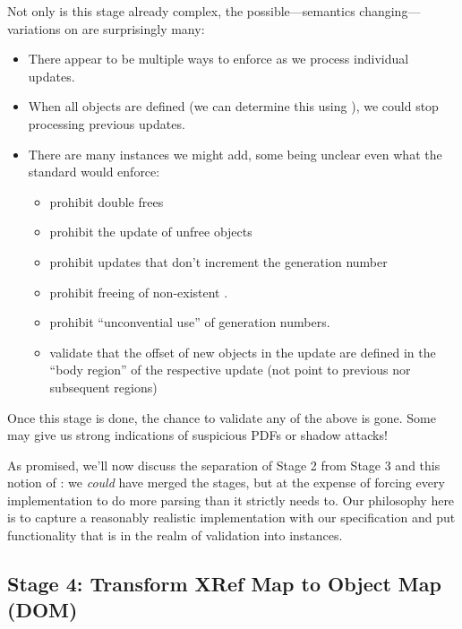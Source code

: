 Not only is this stage already complex, the
possible---semantics changing---variations on
 are surprisingly many:
\begin{itemize}
\item There appear to be multiple ways to enforce  as we
  process individual updates.
\item When all objects are defined (we can determine this using
  ), we could stop processing previous updates.
\item There are many  instances we might add,
  some being unclear even what the standard would enforce:
  \begin{itemize}
  \item prohibit double frees
  \item prohibit the update of unfree objects
  \item prohibit updates that don't increment the generation number
  \item prohibit freeing of non-existent \objids{}.
  \item prohibit ``unconvential use'' of generation numbers.
  \item validate that the offset of new objects in the update are
    defined in the ``body region'' of the respective update (not point
    to previous nor subsequent regions)
  \end{itemize}
\end{itemize}
Once this stage is done, the chance to validate any of
the above is gone.  Some may give us strong indications of suspicious
PDFs or shadow attacks!

As promised, we'll now discuss the separation of Stage 2 from Stage 3
and this notion of : we \emph{could} have merged the
stages, but at the expense of forcing every implementation to do more
parsing than it strictly needs to.  Our philosophy here is to capture
a reasonably realistic implementation with our specification and put
functionality that is in the realm of validation into 
instances.


\subsection{Stage 4: Transform XRef Map to Object Map (DOM)}

